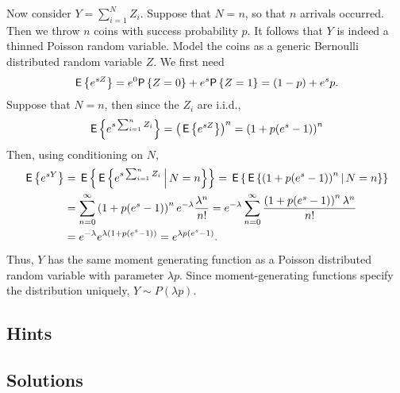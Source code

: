 \begin{exercise}
\begin{solution}
Now consider $Y=\sum_{i=1}^N Z_i$. Suppose that $N=n$, so that $n$
arrivals occurred. Then we throw $n$ coins with success probability
$p$. It follows that $Y$ is indeed a thinned Poisson random variable.
Model the coins as a generic Bernoulli distributed random variable
$Z$.  We first need
\begin{equation*}
  \E{e^{s Z}} = e^0 \P{Z=0} + e^{s} \P{Z=1} = (1-p) + e^s p.
\end{equation*}
Suppose that $N=n$, then since the $Z_i$ are i.i.d.,
\begin{equation*}
\,\mathsf{E}\left\{e^{s\sum_{i=1}^n Z_i}\right\} = \left(\,\mathsf{E}\left\{e^{s Z}\right\}\right)^n = \left(1 + p (e^s - 1)\right)^n
\end{equation*}
Then, using conditioning on $N$, 
\begin{equation*}
  \begin{split}
  \,\mathsf{E}\left\{e^{s Y}\right\}
&= \,\mathsf{E}\left\{\,\mathsf{E}\left\{e^{s\sum_{i=1}^n Z_i} \,\middle|\, N=n \right\}\right\} 
 = \,\mathsf{E}\left\{\,\mathsf{E}\left\{\left(1+p(e^s-1)\right)^n \,\middle|\, N=n \right\}\right\} \\
&= \sum_{n=0}^\infty \left(1+p(e^s-1)\right)^n e^{-\lambda} \frac{\lambda^n}{n!}
= e^{-\lambda} \sum_{n=0}^\infty \frac{\left(1+p(e^s-1)\right)^n \lambda^n}{n!}\\
&= e^{-\lambda} e^{\lambda (1+p(e^s-1))} = e^{\lambda p (e^s - 1)}.
  \end{split}
\end{equation*}
Thus, $Y$ has the same moment generating function as a Poisson
distributed random variable with parameter $\lambda p$. Since
moment-generating functions specify the distribution uniquely,
$Y\sim P(\lambda p)$.
\end{solution}
\end{exercise}    


\subsection*{Hints}

\subsection*{Solutions}

\clearpage

